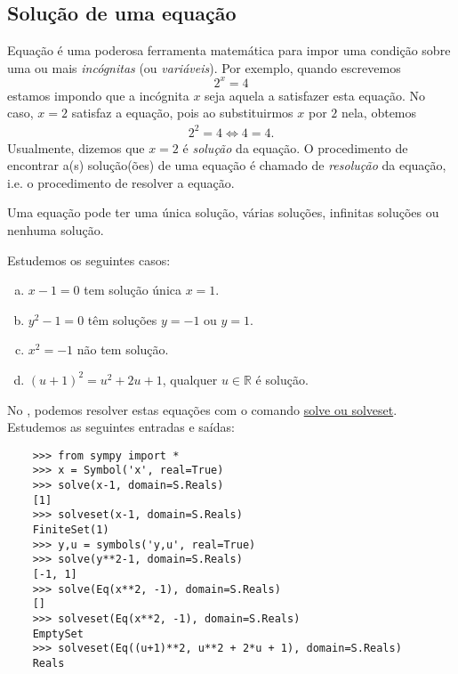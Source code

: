 \subsection{Solução de uma equação}

Equação é uma poderosa ferramenta matemática para impor uma condição sobre uma ou mais \emph{incógnitas} (ou \emph{variáveis}). Por exemplo, quando escrevemos
\begin{equation}
  2^x = 4
\end{equation}
estamos impondo que a incógnita $x$ seja aquela a satisfazer esta equação. No caso, $x=2$ satisfaz a equação, pois ao substituirmos $x$ por $2$ nela, obtemos
\begin{gather}
  2^2 = 4
  \Leftrightarrow 4 = 4.
\end{gather}
Usualmente, dizemos que $x=2$ é \emph{solução} da equação. O procedimento de encontrar a(s) solução(ões) de uma equação é chamado de \emph{resolução} da equação, i.e. o procedimento de resolver a equação.

\begin{obs}
  Uma equação pode ter uma única solução, várias soluções, infinitas soluções ou nenhuma solução.
\end{obs}

\begin{ex}
  Estudemos os seguintes casos:
  \begin{enumerate}[a)]
  \item $x - 1 = 0$ tem solução única $x=1$.
  \item $y^2 - 1 = 0$ têm soluções $y=-1$ ou $y=1$.
  \item $x^2 = -1$ não tem solução.
  \item $(u+1)^2 = u^2 + 2u + 1$, qualquer $u\in\mathbb{R}$ é solução.
  \end{enumerate}

  \ifispython
  No \python, podemos resolver estas equações com o comando \href{https://docs.sympy.org/latest/tutorial/solvers.html#solving-equations-algebraically}{solve ou solveset}. Estudemos as seguintes entradas e saídas:
  \begin{lstlisting}
    >>> from sympy import *
    >>> x = Symbol('x', real=True)
    >>> solve(x-1, domain=S.Reals)
    [1]
    >>> solveset(x-1, domain=S.Reals)
    FiniteSet(1)
    >>> y,u = symbols('y,u', real=True)
    >>> solve(y**2-1, domain=S.Reals)
    [-1, 1]
    >>> solve(Eq(x**2, -1), domain=S.Reals)
    []
    >>> solveset(Eq(x**2, -1), domain=S.Reals)
    EmptySet
    >>> solveset(Eq((u+1)**2, u**2 + 2*u + 1), domain=S.Reals)
    Reals
  \end{lstlisting}
  \fi
\end{ex}

